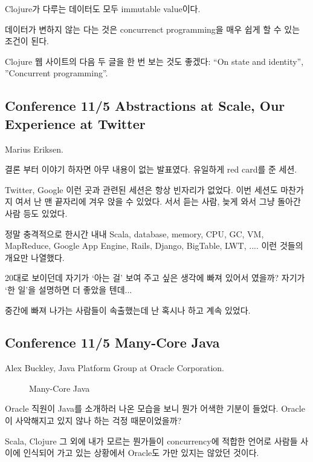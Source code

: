 \documentclass[a4paper]{article}
\begin{document}
Clojure가 다루는 데이터도 모두  immutable value이다. 
 
데이터가 변하지 않는 다는 것은 concurrenct programming을 매우 쉽게 할
수 있는 조건이 된다.
 
Clojure 웹 사이트의 다음 두 글을 한 번 보는 것도 좋겠다:  ``On state and
identity'', ''Concurrent programming''.
 
\subsection{Conference 11/5 Abstractions at Scale, Our Experience at Twitter}
 
Marius Eriksen. 
 
결론 부터 이야기 하자면 아무 내용이 없는 발표였다. 유일하게 red card를
준 세션.
 
Twitter, Google 이런 곳과 관련된 세션은 항상 빈자리가 없었다. 이번
세션도 마찬가지 여서 난 맨 끝자리에 겨우 앉을 수 있었다. 서서 듣는
사람, 늦게 와서 그냥 돌아간 사람 등도 있었다.
 
정말 충격적으로 한시간 내내 Scala, database, memory, CPU, GC, VM,
MapReduce, Google App Engine, Rails, Django, BigTable, LWT, .... 이런
것들의 개요만 나열했다.
 
20대로 보이던데 자기가 `아는 걸' 보여 주고 싶은 생각에 빠져 있어서
였을까? 자기가 `한 일'을 설명하면 더 좋았을 텐데...
 
중간에 빠져 나가는 사람들이 속출했는데 난 혹시나 하고 계속 있었다. 
 
\subsection{Conference 11/5 Many-Core Java}
 
Alex Buckley, Java Platform Group at Oracle Corporation.

\begin{figure}[t]
    \begin{Frame}
        \begin{center}
        \end{center}
    \end{Frame}
    \caption{Many-Core Java}
    \label{lambda}
\end{figure}

Oracle 직원이 Java를 소개하러 나온 모습을 보니 뭔가 어색한 기분이
들었다. Oracle이 사악해지고 있지 않나 하는 걱정 때문이었을까?
 
Scala, Clojure 그 외에 내가 모르는 뭔가들이 concurrency에 적합한 언어로
사람들 사이에 인식되어 가고 있는 상황에서 Oracle도 가만 있지는 않았던
것이다.
\end{document}
